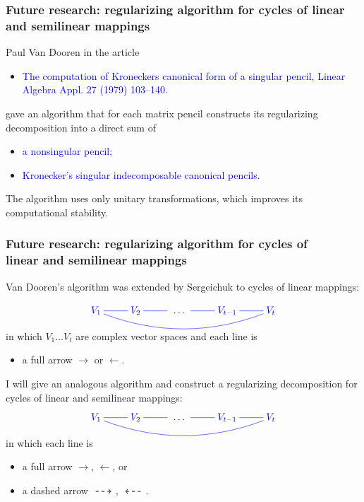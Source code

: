 \documentclass[usenames,dvipsnames]{beamer}
\renewcommand{\dashrightarrow}
{\text{\raisebox{0.9mm} {\
\begin{tikzpicture}[->,thick,xscale=0.56]
  \draw[dashed] (0,0)--(1,0)
;
\end{tikzpicture}}\ }}
\renewcommand{\dashleftarrow}
{\text{\raisebox{0.9mm} {\
\begin{tikzpicture}[<-,thick,xscale=0.56]
  \draw[dashed] (0,0)--(1,0)
;
\end{tikzpicture}}\ }}
\begin{document}
\begin{frame}

\frametitle{\alert{Future research}: regularizing algorithm for cycles of linear and semilinear mappings}
\vspace{-1cm}
Paul Van Dooren in the article
\medskip

\begin{itemize}
  \item \textcolor{blue}{The computation of Kroneckers canonical form of a singular pencil, Linear Algebra
Appl. 27 (1979) 103--140.}
\end{itemize}
\medskip

gave an algorithm that for each matrix pencil constructs its \alert{regularizing decomposition}
into a direct sum of
\begin{itemize}
  \item \textcolor{blue}{a nonsingular pencil};
  \item \textcolor{blue}{Kronecker's singular indecomposable canonical pencils}.
\end{itemize}
\medskip

The algorithm uses only unitary
transformations, which improves its computational stability.



\end{frame}

\begin{frame}

\frametitle{\alert{Future research}: regularizing algorithm for cycles of \\
linear and semilinear mappings}

Van Dooren's algorithm was extended by
Sergeichuk to cycles of linear mappings:

\[
\textcolor{blue}{
\xymatrix{
{V_1}
\ar@{-}@/_1.5pc/[rrrr]
\ar@{-}[r]&
V_2\ar@{-}[r]&
{\ \dots\ }&{V_{t-1}}
\ar@{-}[l]
\ar@{-}[r]&{V_t}}}
\]
\medskip

in which $V_1 \dots V_t$
are complex vector spaces and each line is
\begin{itemize}
  \item a full arrow
      \alert{$\longrightarrow$} or
      \alert{$\longleftarrow$}.
\end{itemize}

\alert{I
will give an analogous algorithm and construct a regularizing
decomposition for cycles of linear and semilinear mappings:}
\[
\textcolor{blue}{
\xymatrix{
{V_1}
\ar@{-}@/_1.5pc/[rrrr]
\ar@{-}[r]&
V_2\ar@{-}[r]&
{\ \dots\ }&{V_{t-1}}
\ar@{-}[l]
\ar@{-}[r]&{V_t}}}
\]

in which each line is
\begin{itemize}
  \item a full arrow
      \alert{$\longrightarrow$},
      \alert{$\longleftarrow$}, or
  \item a dashed arrow
      \alert{$\dashrightarrow$},
      \alert{$\dashleftarrow$}.
\end{itemize}

\end{frame}
\end{document}
